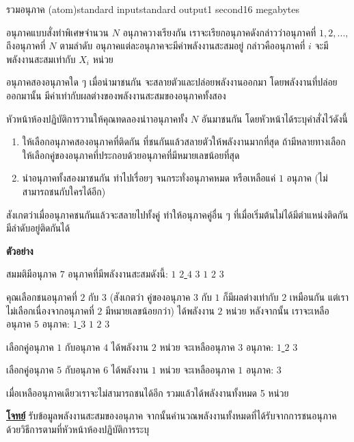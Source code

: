 \documentclass[11pt,a4paper]{article}
\begin{document}
\begin{problem}{รวมอนุภาค (atom)}{standard input}{standard output}{1 second}{16 megabytes}

อนุภาคแบบสั่งทำพิเศษจำนวน $N$ อนุภาควางเรียงกัน เราจะเรียกอนุภาคดังกล่าวว่าอนุภาคที่ $1, 2, ...,$ ถึงอนุภาคที่ $N$ ตามลำดับ อนุภาคแต่ละอนุภาคจะมีค่าพลังงานสะสมอยู่ กล่าวคืออนุภาคที่ $i$ จะมีพลังงานสะสมเท่ากับ $X_i$ หน่วย

                อนุภาคสองอนุภาคใด ๆ เมื่อนำมาชนกัน จะสลายตัวและปล่อยพลังงานออกมา โดยพลังงานที่ปล่อยออกมานั้น มีค่าเท่ากับผลต่างของพลังงานสะสมของอนุภาคทั้งสอง

                หัวหน้าห้องปฏิบัติการวานให้คุณทดลองนำาอนุภาคทั้ง $N$ อันมาชนกัน โดยหัวหน้าได้ระบุคำสั่งไว้ดังนี้ 
\begin{enumerate}
                
\item ให้เลือกอนุภาคสองอนุภาคที่ติดกัน ที่ชนกันแล้วสลายตัวให้พลังงานมากที่สุด ถ้ามีหลายทางเลือกให้เลือกคู่ของอนุภาคที่ประกอบด้วยอนุภาคที่มีหมายเลขน้อยที่สุด 
\item นำอนุภาคทั้งสองมาชนกัน ทำไปเรื่อยๆ จนกระทั่งอนุภาคหมด หรือเหลือแค่ $1$ อนุภาค (ไม่สามารถชนกับใครได้อีก)
\end{enumerate}

                สังเกตว่าเมื่ออนุภาคชนกันแล้วจะสลายไปทั้งคู่ ทำให้อนุภาคคู่อื่น ๆ ที่เมื่อเริ่มต้นไม่ได้มีตำแหน่งติดกัน มีลำดับอยู่ติดกันได้
\bigskip

\textbf{ตัวอย่าง}

สมมติมีอนุภาค $7$ อนุภาคที่มีพลังงานสะสมดังนี้: $1$ \underline{$2$ $4$} $3$ $1$ $2$ $3$

คุณเลือกชนอนุภาคที่ $2$ กับ $3$ (สังเกตว่า คู่ของอนุภาค $3$ กับ $1$ ก็มีผลต่างเท่ากับ $2$ เหมือนกัน แต่เราไม่เลือกเนื่องจากอนุภาคที่ $2$ มีหมายเลขน้อยกว่า) ได้พลังงาน $2$ หน่วย หลังจากนั้น เราจะเหลืออนุภาค $5$ อนุภาค: \underline{$1$ $3$} $1$ $2$ $3$

เลือกคู่อนุภาค $1$ กับอนุภาค $4$ ได้พลังงาน $2$ หน่วย จะเหลืออนุภาค $3$ อนุภาค: \underline{$1$ $2$} $3$

เลือกคู่อนุภาค $5$ กับอนุภาค $6$ ได้พลังงาน $1$ หน่วย จะเหลืออนุภาค $1$ อนุภาค: $3$

                เมื่อเหลืออนุภาคเดียวเราจะไม่สามารถชนได้อีก รวมแล้วได้พลังงานทั้งหมด 5 หน่วย

\bigskip
\underline{\textbf{โจทย์}}  รับข้อมูลพลังงานสะสมของอนุภาค จากนั้นคำนวณพลังงานทั้งหมดที่ได้รับจากการชนอนุภาคด้วยวิธีการตามที่หัวหน้าห้องปฏิบัติการระบุ

\newpage
\InputFile


\end{problem}
\end{document}
